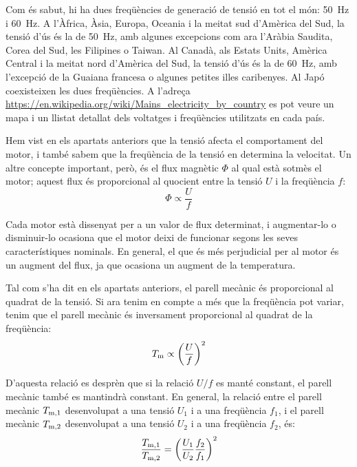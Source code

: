Com és sabut, hi ha dues freqüències de generació de tensió en tot el món: \qty{50}{Hz} i \qty{60}{Hz}. A l'Àfrica, Àsia, Europa,  Oceania i la meitat sud d'Amèrica del Sud, la tensió d'ús és la de \qty{50}{Hz}, amb algunes excepcions com ara l'Aràbia Saudita, Corea del Sud, les Filipines o Taiwan. Al Canadà, als Estats Units, Amèrica Central i la meitat nord  d'Amèrica del Sud, la tensió d'ús és la de \qty{60}{Hz}, amb l'excepció de la Guaiana francesa o algunes petites illes caribenyes. Al Japó coexisteixen les dues freqüències. A l'adreça \href{https://en.wikipedia.org/wiki/Mains_electricity_by_country}
{https:/\!\!/en.wikipedia.org/wiki/Mains\_electricity\_by\_country} es pot veure un mapa i un llistat detallat dels voltatges i freqüències utilitzats en cada país.

Hem vist en els apartats anteriors que la tensió afecta el comportament del motor, i també sabem que la freqüència de la tensió en determina la velocitat. Un altre concepte important, però, és el flux magnètic $\Phi$ al qual està sotmès el motor; aquest flux és proporcional al quocient entre la tensió $U$ i la freqüència $f$:
\begin{equation}
	\Phi \propto \frac{U}{f}
\end{equation}

Cada motor està dissenyat per a un valor de flux determinat, i augmentar-lo  o disminuir-lo ocasiona que el motor deixi de funcionar segons les seves característiques nominals. En general, el que és més perjudicial per al motor és un augment del flux, ja que  ocasiona un  augment de la temperatura.

Tal com s'ha dit en els apartats anteriors, el parell mecànic és proporcional al quadrat de la tensió. Si ara tenim en compte a més que la freqüència pot variar, tenim que el parell mecànic és inversament proporcional al quadrat de la freqüència:
\begin{equation}
	T_\mathrm{m} \propto {\left(\frac{U}{f}\right)}^2
\end{equation}

D'aquesta relació es desprèn que si la relació $U/f$ es manté constant, el parell mecànic també es mantindrà constant. En general, la relació entre el parell mecànic $T_\mathrm{m,1}$ desenvolupat a una tensió $U_1$ i a una freqüència $f_1$, i el parell mecànic $T_\mathrm{m,2}$ desenvolupat a una tensió $U_2$ i a una freqüència $f_2$, és:
\begin{equation}\label{eq:Tm_U_f}
	\frac{T_\mathrm{m,1}}{T_\mathrm{m,2}}={\left(\frac{{U}_{1}}{{U}_{2}}\frac{{f}_{2}}{{f}_{1}}\right)}^2
\end{equation}

